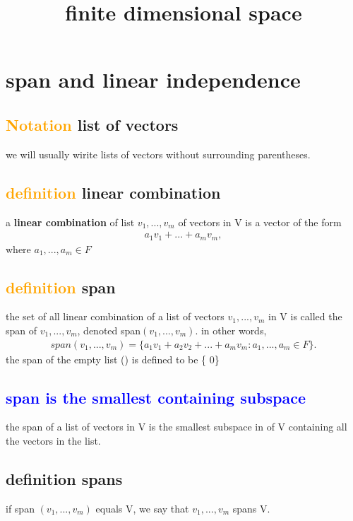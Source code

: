 \documentclass[a4paper,12pt]{article}
\begin{document}
\title {finite dimensional space}
\maketitle

\tableofcontents
\newpage

\section{\textbf{span and linear independence}}
    \subsection{\textcolor{orange}{Notation} \textbf{list of vectors}}
    we will usually wirite lists of vectors without surrounding parentheses.

    \subsection{\textcolor{orange}{definition} \textbf{linear combination}}
    a \textbf{linear combination} of list $v_1,...,v_m$ of vectors in V is a vector of the form
    \begin{align*}
        a_1v_1 + ... + a_mv_m,
    \end{align*}
    where $a_1,...,a_m \in F$

    \subsection{\textcolor{orange}{definition} \textbf{span}}
    the set of all linear combination of a list of vectors $v_1,...,v_m$ in V is  called the span of 
    $v_1,...,v_m$, denoted span$(v_1,...,v_m)$. in other words,
    \begin{align*}
        span(v_1,...,v_m) = \{a_1v_1 + a_2v_2 + ... + a_mv_m : a_1,...,a_m \in F\}.
    \end{align*}
    the span of the empty list () is defined to be \{ 0\}

    \subsection{\textcolor{blue}{span is the smallest containing subspace}}
    the span of a list of vectors in V is the smallest subspace in of V containing all
    the vectors in the list.
    \subsection{definition \textbf{spans}}
    if span $(v_1,...,v_m)$ equals V, we say that $v_1,...,v_m$ spans V.
\end{document}
